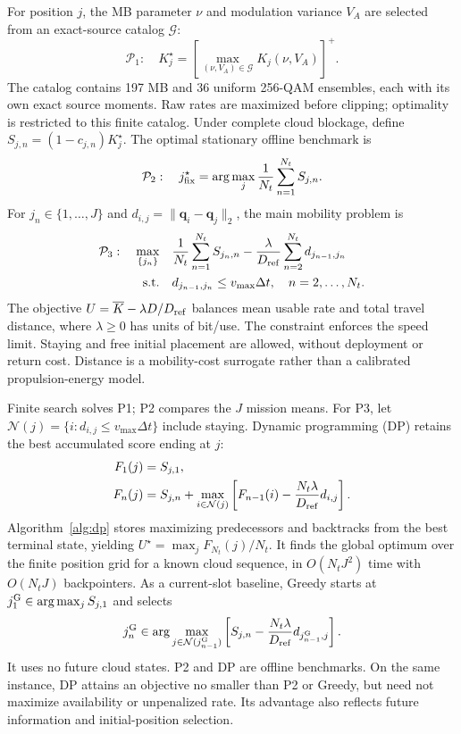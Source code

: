\documentclass[conference,a4paper]{IEEEtran}
\begin{document}
For position $j$, the MB parameter $\nu$ and modulation variance $V_A$
are selected from an exact-source catalog $\mathcal G$:
\begin{equation}
 \mathcal P_1:\quad K_j^\star=
 \left[\max_{(\nu,V_A)\in\mathcal G}K_j(\nu,V_A)\right]^+.
 \label{eq:p1}
\end{equation}
The catalog contains 197 MB and 36 uniform 256-QAM ensembles, each with
its own exact source moments. Raw rates are maximized before clipping;
optimality is restricted to this finite catalog. Under complete cloud
blockage, define $S_{j,n}=(1-c_{j,n})K_j^\star$. The optimal stationary
offline benchmark is
\begin{equation}
 \mathcal P_2:\quad j_{\rm fix}^\star=
 \arg\max_j\frac{1}{N_t}\sum_{n=1}^{N_t}S_{j,n}.
 \label{eq:p2}
\end{equation}
For $j_n\in\{1,\ldots,J\}$ and
$d_{i,j}=\|\mathbf q_i-\mathbf q_j\|_2$, the main mobility problem is
\begin{align}
 \mathcal P_3:\quad \max_{\{j_n\}}\quad&
 \frac{1}{N_t}\sum_{n=1}^{N_t}S_{j_n,n}
 -\frac{\lambda}{D_{\rm ref}}\sum_{n=2}^{N_t}d_{j_{n-1},j_n}
 \label{eq:p3}\\
 \mathrm{s.t.}\quad& d_{j_{n-1},j_n}\le v_{\max}\Delta t,
 \quad n=2,\ldots,N_t.\nonumber
\end{align}
The objective $U=\overline K-\lambda D/D_{\rm ref}$ balances mean usable
rate and total travel distance, where $\lambda\ge0$ has units of bit/use.
The constraint enforces the speed limit. Staying and free initial placement
are allowed, without deployment or return cost. Distance is a mobility-cost
surrogate rather than a calibrated propulsion-energy model.

Finite search solves P1; P2 compares the $J$ mission means. For P3, let
$\mathcal N(j)=\{i:d_{i,j}\le v_{\max}\Delta t\}$ include staying.
Dynamic programming (DP) retains the best accumulated score ending at $j$:
\begin{align}
 F_1(j)&=S_{j,1},\label{eq:dp_init}\\
 F_n(j)&=S_{j,n}+\max_{i\in\mathcal N(j)}
 \left[F_{n-1}(i)-\frac{N_t\lambda}{D_{\rm ref}}d_{i,j}\right].
 \label{eq:dp}
\end{align}
Algorithm~\ref{alg:dp} stores maximizing predecessors and backtracks from
the best terminal state, yielding $U^\star=\max_jF_{N_t}(j)/N_t$.
It finds the global optimum over the finite position grid for a known
cloud sequence, in $O(N_tJ^2)$ time with $O(N_tJ)$ backpointers.
As a current-slot baseline, Greedy starts at
$j_1^{\rm G}\in\arg\max_jS_{j,1}$ and selects
\begin{equation}
 j_n^{\rm G}\in\arg\max_{j\in\mathcal N(j_{n-1}^{\rm G})}
 \left[S_{j,n}-\frac{N_t\lambda}{D_{\rm ref}}d_{j_{n-1}^{\rm G},j}\right].
 \label{eq:greedy}
\end{equation}
It uses no future cloud states. P2 and DP are offline benchmarks.
On the same instance, DP attains an objective no smaller than P2 or Greedy,
but need not maximize availability or unpenalized rate. Its advantage also
reflects future information and initial-position selection.
\end{document}
